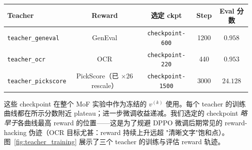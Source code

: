 \documentclass[11pt,a4paper]{article}
\theoremstyle{definition}
\begin{document}
\begin{center}
\renewcommand{\arraystretch}{1.4}
\begin{tabular}{l|cccc}
\toprule
\textbf{Teacher} & \textbf{Reward} & \textbf{选定 ckpt} & \textbf{Step} & \textbf{Eval 分数} \\
\midrule
\texttt{teacher\_geneval}   & GenEval                        & \texttt{checkpoint-600}  & 1200 & $0.958$ \\
\texttt{teacher\_ocr}       & OCR                            & \texttt{checkpoint-220}  & 440  & $0.953$ \\
\texttt{teacher\_pickscore} & PickScore（已 $\times 26$ rescale）& \texttt{checkpoint-1500} & 3000 & $24.128$ \\
\bottomrule
\end{tabular}
\end{center}

这些 checkpoint 在整个 MoF 实验中作为冻结的 $v^{(k)}$ 使用。每个 teacher
的训练曲线都在所示分数附近 plateau；进一步微调收益递减。我们选定的
checkpoint \emph{略早于}各曲线最高 reward 的位置——这是为了规避 DPPO
微调后期常见的 reward-hacking 伪迹（OCR 目标尤甚：reward 持续上升远超
"清晰文字"饱和点）。图~\ref{fig:teacher_training} 展示了三个 teacher
的训练与评估 reward 轨迹。
\end{document}
